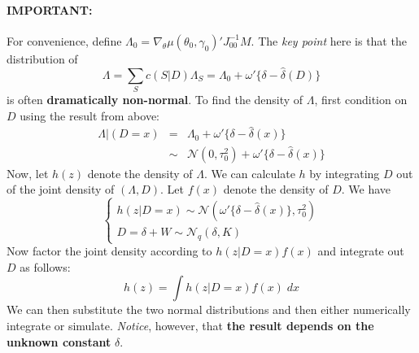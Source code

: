 \paragraph{IMPORTANT:} For convenience, define $\Lambda_0 = \nabla_\theta \mu(\theta_0,\gamma_0)' J_{00}^{-1} M$. The \emph{key point} here is that the distribution of
	$$\Lambda = \sum_{S}c(S|D)\Lambda_S = \Lambda_0 + \omega'\{\delta - \hat{\delta}(D) \}$$
is often \textbf{dramatically non-normal}. To find the density of $\Lambda$, first condition on $D$ using the result from above:
	\begin{eqnarray*}
		\Lambda|(D=x) &=& \Lambda_0 + \omega'\{\delta - \hat{\delta}(x) \}\\
		 &\sim& \mathcal{N}(0,\tau_0^2) +  \omega'\{\delta - \hat{\delta}(x) \}
\end{eqnarray*}
Now, let $h(z)$ denote the density of $\Lambda$. We can calculate $h$ by integrating $D$ out of the joint density of $(\Lambda,D)$. Let $f(x)$ denote the density of $D$. We have
	$$
	\left\{\begin{array}{l}
		h(z|D=x) \sim \mathcal{N}\left( \omega'\{\delta - \hat{\delta}(x) \} , \tau_0^2\right)\\
		D = \delta + W \sim \mathcal{N}_q(\delta,K)
\end{array}\right.
$$
Now factor the joint density according to $h(z|D=x)f(x)$ and integrate out $D$ as follows:
	$$
	h(z) = \int h(z|D=x)f(x)\; dx
$$
We can then substitute the two normal distributions and then either numerically integrate or simulate. \emph{Notice}, however, that \textbf{the result depends on the unknown constant} $\delta$. 



